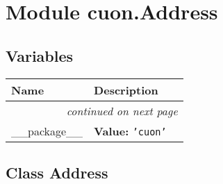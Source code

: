 %
%
%


\section{Module cuon.Address}

    \label{cuon:Address}


  \subsection{Variables}

    \vspace{-1cm}
\hspace{\varindent}\begin{longtable}{|p{\varnamewidth}|p{\vardescrwidth}|l}
\cline{1-2}
\cline{1-2} \centering \textbf{Name} & \centering \textbf{Description}& \\
\cline{1-2}
\endhead\cline{1-2}\multicolumn{3}{r}{\small\textit{continued on next page}}\\\endfoot\cline{1-2}
\endlastfoot\raggedright \_\-\_\-p\-a\-c\-k\-a\-g\-e\-\_\-\_\- & \raggedright \textbf{Value:} 
{\tt \texttt{'}\texttt{cuon}\texttt{'}}&\\
\cline{1-2}
\end{longtable}



\subsection{Class Address}

